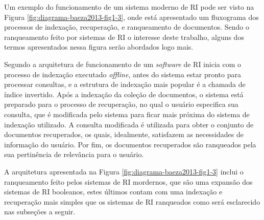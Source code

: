     Um exemplo do funcionamento de um sistema moderno de RI pode ser visto na Figura \ref{fig:diagrama-baeza2013-fig1-3}, onde está apresentado um fluxograma dos processos de indexação, recuperação, e ranqueamento de documentos. 
    Sendo o ranqueamento feito por sistemas de RI o interesse deste trabalho, alguns dos termos apresentados nessa figura serão abordados logo mais.
    
    
    
    Segundo  a arquitetura de funcionamento de um \textit{software} de RI inicia com o processo de indexação executado \textit{offline}, antes do sistema estar pronto para processar consultas, e a estrutura de indexação mais popular é a chamada de índice invertido.
    Após a indexação da coleção de documentos, o sistema está preparado para o processo de recuperação, no qual o usuário especifica sua consulta, que é modificada pelo sistema para ficar mais próxima do sistema de indexação utilizado.
    A consulta modificada é utilizada para obter o conjunto de documentos recuperados, os quais, idealmente, satisfazem as necessidades de informação do usuário.
    Por fim, os documentos recuperados são ranqueados pela sua pertinência de relevância para o usuário.
    
    A arquitetura apresentada na Figura \ref{fig:diagrama-baeza2013-fig1-3} inclui o ranqueamento feito pelos sistemas de RI mordernos, que são uma expansão dos sistemas de RI booleanos, estes últimos contam com uma indexação e recuperação mais simples que os sistemas de RI ranqueados como será esclarecido nas subseções a seguir.

    
    
    

